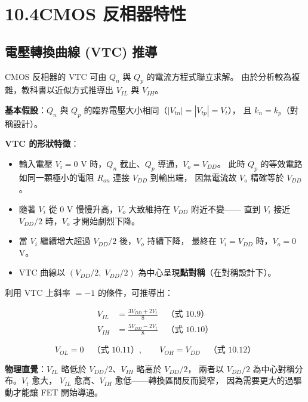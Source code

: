 \documentclass[12pt]{article}
\begin{document}
\section*{10.4\quad CMOS 反相器特性}

\subsection*{電壓轉換曲線 (VTC) 推導}

CMOS 反相器的 VTC 可由 $Q_n$ 與 $Q_p$ 的電流方程式聯立求解。
由於分析較為複雜，教科書以近似方式推導出 $V_{IL}$ 與 $V_{IH}$。

\textbf{基本假設}：$Q_n$ 與 $Q_p$ 的臨界電壓大小相同（$|V_{tn}| = |V_{tp}| = V_t$），
且 $k_n = k_p$（對稱設計）。

\textbf{VTC 的形狀特徵}：
\begin{itemize}[leftmargin=2.2em,itemsep=2pt]
  \item 輸入電壓 $V_i = 0$ V 時，$Q_n$ 截止、$Q_p$ 導通，$V_o = V_{DD}$。
    此時 $Q_p$ 的等效電路如同一顆極小的電阻 $R_{on}$ 連接 $V_{DD}$ 到輸出端，
    因無電流故 $V_o$ 精確等於 $V_{DD}$。
  \item 隨著 $V_i$ 從 0 V 慢慢升高，$V_o$ 大致維持在 $V_{DD}$ 附近不變——
    直到 $V_i$ 接近 $V_{DD}/2$ 時，$V_o$ 才開始劇烈下降。
  \item 當 $V_i$ 繼續增大超過 $V_{DD}/2$ 後，$V_o$ 持續下降，
    最終在 $V_i = V_{DD}$ 時，$V_o = 0$ V。
  \item VTC 曲線以 $(V_{DD}/2,\; V_{DD}/2)$ 為中心呈現\textbf{點對稱}（在對稱設計下）。
\end{itemize}

利用 VTC 上斜率 $= -1$ 的條件，可推導出：

\begin{formulabox}
\begin{align*}
  V_{IL} &= \frac{3V_{DD} + 2V_t}{8} \quad\text{（式 10.9）} \\[6pt]
  V_{IH} &= \frac{5V_{DD} - 2V_t}{8} \quad\text{（式 10.10）}
\end{align*}
\end{formulabox}

\begin{formulabox}
\[
  V_{OL} = 0 \quad\text{（式 10.11）},\qquad V_{OH} = V_{DD} \quad\text{（式 10.12）}
\]
\end{formulabox}

\textbf{物理直覺}：$V_{IL}$ 略低於 $V_{DD}/2$、$V_{IH}$ 略高於 $V_{DD}/2$，
兩者以 $V_{DD}/2$ 為中心對稱分布。$V_t$ 愈大，
$V_{IL}$ 愈高、$V_{IH}$ 愈低——轉換區間反而變窄，
因為需要更大的過驅動才能讓 FET 開始導通。
\end{document}
